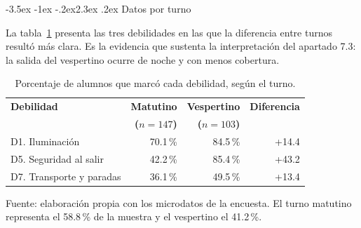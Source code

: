 \documentclass[11pt,a4paper]{article}
\makeatletter
\renewcommand\section{\@startsection{section}{1}{\z@}%
  {-3.5ex \@plus -1ex \@minus -.2ex}{2.3ex \@plus .2ex}%
  {\normalfont\Large\bfseries\color{uazblue}}}
\makeatother
\begin{document}
\section{Datos por turno}

La tabla~\ref{tab:turno} presenta las tres debilidades en las que la diferencia
entre turnos resultó más clara. Es la evidencia que sustenta la interpretación
del apartado 7.3: la salida del vespertino ocurre de noche y con menos
cobertura.

\begin{table}[H]
\centering
\small
\caption{Porcentaje de alumnos que marcó cada debilidad, según el turno.}
\label{tab:turno}
\begin{tabular}{@{}lrrr@{}}
\toprule
\textbf{Debilidad} & \textbf{Matutino} & \textbf{Vespertino} & \textbf{Diferencia} \\
 & \textbf{($n=147$)} & \textbf{($n=103$)} & \\
\midrule
D1. Iluminación & 70.1\,\% & 84.5\,\% & +14.4 \\
D5. Seguridad al salir & 42.2\,\% & 85.4\,\% & +43.2 \\
D7. Transporte y paradas & 36.1\,\% & 49.5\,\% & +13.4 \\
\bottomrule
\end{tabular}

\vspace{4pt}
\begin{minipage}{0.9\linewidth}
\footnotesize
Fuente: elaboración propia con los microdatos de la encuesta. El turno matutino
representa el 58.8\,\% de la muestra y el vespertino el 41.2\,\%.
\end{minipage}
\end{table}
\end{document}
